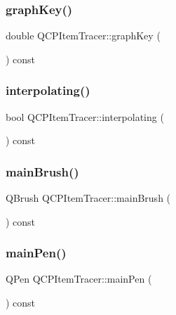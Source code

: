 \subsubsection{\texorpdfstring{graphKey()}{graphKey()}}
{\footnotesize\ttfamily double Q\+C\+P\+Item\+Tracer\+::graph\+Key (\begin{DoxyParamCaption}{ }\end{DoxyParamCaption}) const\hspace{0.3cm}{\ttfamily [inline]}}

\mbox{\label{class_q_c_p_item_tracer_ae9ab6d72e0a35e1769c0b5a9b58181f2}} 
\subsubsection{\texorpdfstring{interpolating()}{interpolating()}}
{\footnotesize\ttfamily bool Q\+C\+P\+Item\+Tracer\+::interpolating (\begin{DoxyParamCaption}{ }\end{DoxyParamCaption}) const\hspace{0.3cm}{\ttfamily [inline]}}

\mbox{\label{class_q_c_p_item_tracer_a94f81c54197577e86c53a60cf39155cd}} 
\subsubsection{\texorpdfstring{mainBrush()}{mainBrush()}}
{\footnotesize\ttfamily Q\+Brush Q\+C\+P\+Item\+Tracer\+::main\+Brush (\begin{DoxyParamCaption}{ }\end{DoxyParamCaption}) const\hspace{0.3cm}{\ttfamily [protected]}}

\mbox{\label{class_q_c_p_item_tracer_abffdcf64d0f84f7b41bd4af07d144642}} 
\subsubsection{\texorpdfstring{mainPen()}{mainPen()}}
{\footnotesize\ttfamily Q\+Pen Q\+C\+P\+Item\+Tracer\+::main\+Pen (\begin{DoxyParamCaption}{ }\end{DoxyParamCaption}) const\hspace{0.3cm}{\ttfamily [protected]}}

